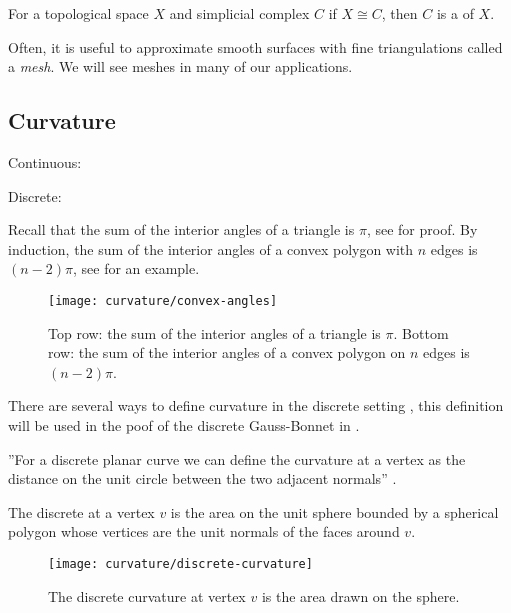 \begin{definition}[Triangulation]
For a topological space $X$ and simplicial complex $C$ if $X\cong C$,
then $C$  is a  of $X$.
\end{definition}

Often, it is useful to approximate smooth surfaces with fine triangulations called
a \emph{mesh}. We will see meshes in many of our applications.

\subsection{Curvature}
Continuous:

Discrete:

Recall that the sum of the interior angles of a triangle is $\pi$,
see  for proof. By induction, the sum of the interior angles
of a convex polygon with $n$ edges is  $(n-2)\pi$, see 
for an example. 

\begin{figure}[htb]
\centering
\texttt{[image: curvature/convex-angles]}
\caption{Top row: the sum of  the interior angles of a triangle is $\pi$.
Bottom row: the sum of the interior angles of a convex polygon on $n$ edges is $(n-2)\pi$.}
\label{fig:angles}
\end{figure}


There are several ways to define curvature in the discrete setting \cite{Crane:2013},
this definition will be used in the poof of the discrete Gauss-Bonnet in .

''For a discrete planar curve we can define the curvature at a vertex as the distance on the unit circle between the two adjacent normals'' \cite{Crane:2013}.

\begin{definition}\label{def:discrete-curvature-vertex}

The discrete  at a vertex $v$ is the area on the unit sphere bounded by a spherical polygon whose vertices are the unit normals of the faces around $v$.

\end{definition}


\begin{figure}[htb]
\centering
\texttt{[image: curvature/discrete-curvature]}
\caption{The discrete curvature at vertex $v$ is the area drawn on the sphere.}
\label{fig:discrete-curvature}
\end{figure}

